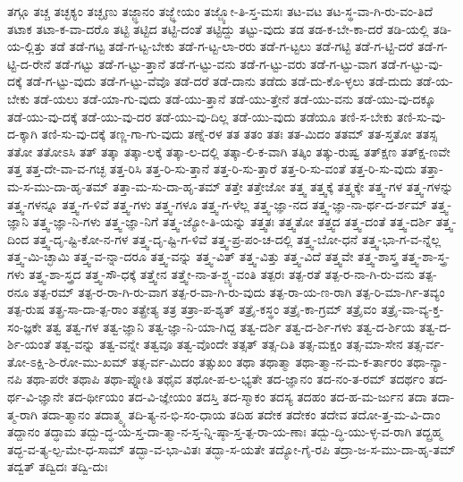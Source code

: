 {ತಗ್ಗೂ
ತಚ್ಚ
ತಚ್ಛಕ್ಯಂ
ತಚ್ಛೃಣು
ತಜ್ಜ್ಞಾನಂ
ತಜ್ಜ್ಞೇಯಂ
ತಜ್ಜ್ಯೋ-ತಿ-ಸ್ತ-ಮಸಃ
ತಟ-ವಟ
ತಟ-ಸ್ಥ-ವಾ-ಗಿ-ರು-ವಂ-ತಿದೆ
ತಟಾಕ
ತಟಾ-ಕ-ವಾ-ದರೊ
ತಟ್ಟಿ
ತಟ್ಟಿದ
ತಟ್ಟಿ-ದಂತೆ
ತಟ್ಟಿದ್ದು
ತಟ್ಟು-ವುದು
ತಡ
ತಡ-ಕ-ಬೇ-ಕಾ-ದರೆ
ತಡಿ-ಯಲ್ಲಿ
ತಡಿ-ಯ-ಲ್ಲಿತ್ತು
ತಡೆ
ತಡೆ-ಗಟ್ಟ
ತಡೆ-ಗ-ಟ್ಟ-ಬೇಕು
ತಡೆ-ಗ-ಟ್ಟ-ಲಾ-ರರು
ತಡೆ-ಗ-ಟ್ಟಲು
ತಡೆ-ಗಟ್ಟಿ
ತಡೆ-ಗ-ಟ್ಟಿ-ದರೆ
ತಡೆ-ಗ-ಟ್ಟಿ-ದ-ರೇನೆ
ತಡೆ-ಗಟ್ಟು
ತಡೆ-ಗ-ಟ್ಟು-ತ್ತಾನೆ
ತಡೆ-ಗ-ಟ್ಟು-ವನು
ತಡೆ-ಗ-ಟ್ಟು-ವರು
ತಡೆ-ಗ-ಟ್ಟು-ವಾಗ
ತಡೆ-ಗ-ಟ್ಟು-ವು-ದಕ್ಕೆ
ತಡೆ-ಗ-ಟ್ಟು-ವುದು
ತಡೆ-ಗ-ಟ್ಟು-ವೆವೊ
ತಡೆ-ದರೆ
ತಡೆ-ದಾನು
ತಡೆದು
ತಡೆ-ದು-ಕೊ-ಳ್ಳಲು
ತಡೆ-ದುದು
ತಡೆ-ಯ-ಬೇಕು
ತಡೆ-ಯಲು
ತಡೆ-ಯಾ-ಗು-ವುದು
ತಡೆ-ಯು-ತ್ತಾನೆ
ತಡೆ-ಯು-ತ್ತೇನೆ
ತಡೆ-ಯು-ವನು
ತಡೆ-ಯು-ವು-ದಕ್ಕೂ
ತಡೆ-ಯು-ವು-ದಕ್ಕೆ
ತಡೆ-ಯು-ವು-ದರ
ತಡೆ-ಯು-ವು-ದಿಲ್ಲ
ತಡೆ-ಯು-ವುದು
ತಡೆಯೂ
ತಣಿ-ಸ-ಬೇಕು
ತಣಿ-ಸು-ವು-ದ-ಕ್ಕಾಗಿ
ತಣಿ-ಸು-ವು-ದಕ್ಕೆ
ತಣ್ಣ-ಗಾ-ಗು-ವುದು
ತಣ್ನೆ-ರಳ
ತತ
ತತಂ
ತತಃ
ತತ-ಮಿದಂ
ತತಮ್
ತತ-ಸ್ತತೋ
ತತಸ್ಸ
ತತೋ
ತತೋಽಸಿ
ತತ್
ತತ್ಕಾ
ತತ್ಕಾ-ಲಕ್ಕೆ
ತತ್ಕಾ-ಲ-ದಲ್ಲಿ
ತತ್ಕಾ-ಲಿ-ಕ-ವಾಗಿ
ತತ್ಕಿಂ
ತತ್ಕು-ರುಷ್ವ
ತತ್ಕ್ಷಣ
ತತ್ಕ್ಷ-ಣವೇ
ತತ್ತ
ತತ್ತ-ದೇ-ವಾ-ವ-ಗಚ್ಛ
ತತ್ತ-ರಿಸಿ
ತತ್ತ-ರಿ-ಸು-ತ್ತಾನೆ
ತತ್ತ-ರಿ-ಸು-ತ್ತಾರೆ
ತತ್ತ-ರಿ-ಸು-ವಂತೆ
ತತ್ತ-ರಿ-ಸು-ವುದು
ತತ್ತಾ-ಮ-ಸ-ಮು-ದಾ-ಹೃ-ತಮ್
ತತ್ತಾ-ಮ-ಸು-ದಾ-ಹೃ-ತಮ್
ತತ್ತೇ
ತತ್ತೇಜೋ
ತತ್ತ್ವ
ತತ್ತ್ವಕ್ಕೆ
ತತ್ತ್ವಕ್ಕೇ
ತತ್ತ್ವ-ಗಳ
ತತ್ತ್ವ-ಗಳನ್ನು
ತತ್ತ್ವ-ಗಳನ್ನೂ
ತತ್ತ್ವ-ಗ-ಳಿವೆ
ತತ್ತ್ವ-ಗಳು
ತತ್ತ್ವ-ಗಳೂ
ತತ್ತ್ವ-ಗ-ಳೆಲ್ಲ
ತತ್ತ್ವ-ಜ್ಞಾ-ನದ
ತತ್ತ್ವ-ಜ್ಞಾ-ನಾ-ರ್ಥ-ದ-ರ್ಶಮ್
ತತ್ತ್ವ-ಜ್ಞಾನಿ
ತತ್ತ್ವ-ಜ್ಞಾ-ನಿ-ಗಳು
ತತ್ತ್ವ-ಜ್ಞಾ-ನಿಗೆ
ತತ್ತ್ವ-ಜ್ಯೋ-ತಿ-ಯನ್ನು
ತತ್ತ್ವತಃ
ತತ್ತ್ವತೋ
ತತ್ತ್ವದ
ತತ್ತ್ವ-ದಂತೆ
ತತ್ತ್ವ-ದರ್ಶಿ
ತತ್ತ್ವ-ದಿಂದ
ತತ್ತ್ವ-ದೃ-ಷ್ಟಿ-ಕೋ-ನ-ಗಳ
ತತ್ತ್ವ-ದೃ-ಷ್ಟಿ-ಗ-ಳಿವೆ
ತತ್ತ್ವ-ಪ್ರ-ಪಂ-ಚ-ದಲ್ಲಿ
ತತ್ತ್ವ-ಬೋ-ಧನೆ
ತತ್ತ್ವ-ಭಾ-ಗ-ವ-ನ್ನೆಲ್ಲ
ತತ್ತ್ವ-ಮಿ-ಚ್ಛಾಮಿ
ತತ್ತ್ವ-ವ-ನ್ನಾ-ದರೂ
ತತ್ತ್ವ-ವನ್ನು
ತತ್ತ್ವ-ವಿತ್
ತತ್ತ್ವ-ವಿತ್ತು
ತತ್ತ್ವ-ವಿದೆ
ತತ್ತ್ವವೇ
ತತ್ತ್ವ-ಶಾಸ್ತ್ರ
ತತ್ತ್ವ-ಶಾ-ಸ್ತ್ರ-ಗಳು
ತತ್ತ್ವ-ಶಾ-ಸ್ತ್ರದ
ತತ್ತ್ವ-ಸೌ-ಧಕ್ಕೆ
ತತ್ತ್ವೇನ
ತತ್ತ್ವೇ-ನಾ-ತ-ಶ್ಚ್ಯ-ವಂತಿ
ತತ್ಪರಃ
ತತ್ಪ-ರತೆ
ತತ್ಪ-ರ-ನಾ-ಗಿ-ರು-ವನು
ತತ್ಪ-ರನೂ
ತತ್ಪ-ರಮ್
ತತ್ಪ-ರ-ರಾ-ಗಿ-ರು-ವಾಗ
ತತ್ಪ-ರ-ವಾ-ಗಿ-ರು-ವುದು
ತತ್ಪ-ರಾ-ಯ-ಣ-ರಾಗಿ
ತತ್ಪ-ರಿ-ಮಾ-ರ್ಗಿ-ತವ್ಯಂ
ತತ್ಪ-ರುಷ
ತತ್ಪ್ರ-ಸಾ-ದಾ-ತ್ಪ-ರಾಂ
ತತ್ಪ್ರೇತ್ಯ
ತತ್ರ
ತತ್ರಾ-ಪ-ಶ್ಯತ್
ತತ್ರೈ-ಕಸ್ಥಂ
ತತ್ರೈ-ಕಾ-ಗ್ರಮ್
ತತ್ರೈವಂ
ತತ್ರೈ-ವಾ-ವ್ಯ-ಕ್ತ-ಸಂ-ಜ್ಞಕೇ
ತತ್ವ
ತತ್ವ-ಗಳ
ತತ್ವ-ಜ್ಞಾನಿ
ತತ್ವ-ಜ್ಞಾ-ನಿ-ಯಾ-ಗಿದ್ದ
ತತ್ವ-ದರ್ಶಿ
ತತ್ವ-ದ-ರ್ಶಿ-ಗಳು
ತತ್ವ-ದ-ರ್ಶಿಯ
ತತ್ವ-ದ-ರ್ಶಿ-ಯಂತೆ
ತತ್ವ-ವನ್ನು
ತತ್ವ-ವನ್ನೇ
ತತ್ವವೂ
ತತ್ವ-ವೊಂದೇ
ತತ್ಸತ್
ತತ್ಸ-ದಿತಿ
ತತ್ಸ-ಮಕ್ಷಂ
ತತ್ಸ-ಮಾ-ಸೇನ
ತತ್ಸ-ರ್ವ-ತೋ-ಽಕ್ಷಿ-ಶಿ-ರೋ-ಮು-ಖಮ್
ತತ್ಸ-ರ್ವ-ಮಿದಂ
ತತ್ಸುಖಂ
ತಥಾ
ತಥಾತ್ಮಾ
ತಥಾ-ತ್ಮಾ-ನ-ಮ-ಕ-ರ್ತಾರಂ
ತಥಾ-ನ್ಯಾ-ನಪಿ
ತಥಾ-ಪರೇ
ತಥಾಪಿ
ತಥಾ-ಪ್ನೋತಿ
ತಥೈವ
ತಥೋ-ಪ-ಲ-ಭ್ಯತೇ
ತದ-ಜ್ಞಾನಂ
ತದ-ನಂ-ತ-ರಮ್
ತದರ್ಥಂ
ತದ-ರ್ಥ-ವಿ-ಜ್ಞಾನೇ
ತದ-ರ್ಥೀಯಂ
ತದ-ವಿ-ಜ್ಞೇಯಂ
ತದಸ್ತಿ
ತದ-ಸ್ಮಾಕಂ
ತದಸ್ಯ
ತದಹಂ
ತದ-ಹ-ಮ-ರ್ಜುನ
ತದಾ
ತದಾ-ತ್ಮ-ರಾಗಿ
ತದಾ-ತ್ಮಾನಂ
ತದಾತ್ಮ್ಯ
ತದಿ-ತ್ಯ-ನ-ಭಿ-ಸಂ-ಧಾಯ
ತದಿಹ
ತದೇಕ
ತದೇಕಂ
ತದೇವ
ತದೋ-ತ್ತ-ಮ-ವಿ-ದಾಂ
ತದ್ದಾನಂ
ತದ್ಧಾಮ
ತದ್ಬು-ದ್ಧ-ಯ-ಸ್ತ-ದಾ-ತ್ಮಾ-ನ-ಸ್ತ-ನ್ನಿ-ಷ್ಠಾ-ಸ್ತ-ತ್ಪ-ರಾ-ಯ-ಣಾಃ
ತದ್ಬು-ದ್ಧಿ-ಯು-ಳ್ಳ-ವ-ರಾಗಿ
ತದ್ಬ್ರಹ್ಮ
ತದ್ಭ-ವ-ತ್ಯ-ಲ್ಪ-ಮೇ-ಧ-ಸಾಮ್
ತದ್ಭಾ-ವ-ಭಾ-ವಿತಃ
ತದ್ಭಾ-ಸ-ಯತೇ
ತದ್ಯೋ-ಗೈ-ರಪಿ
ತದ್ರಾ-ಜ-ಸ-ಮು-ದಾ-ಹೃ-ತಮ್
ತದ್ವತ್
ತದ್ವಿದಃ
ತದ್ವಿ-ದುಃ
}

